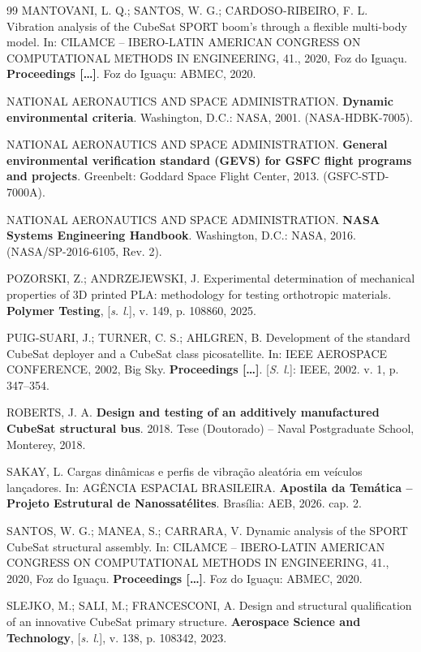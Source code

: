 \begin{thebibliography}{99}
MANTOVANI, L. Q.; SANTOS, W. G.; CARDOSO-RIBEIRO, F. L. Vibration analysis of the CubeSat SPORT boom's through a flexible multi-body model. In: CILAMCE -- IBERO-LATIN AMERICAN CONGRESS ON COMPUTATIONAL METHODS IN ENGINEERING, 41., 2020, Foz do Iguaçu. \textbf{Proceedings [\ldots]}. Foz do Iguaçu: ABMEC, 2020.

NATIONAL AERONAUTICS AND SPACE ADMINISTRATION. \textbf{Dynamic environmental criteria}. Washington, D.C.: NASA, 2001. (NASA-HDBK-7005).

NATIONAL AERONAUTICS AND SPACE ADMINISTRATION. \textbf{General environmental verification standard (GEVS) for GSFC flight programs and projects}. Greenbelt: Goddard Space Flight Center, 2013. (GSFC-STD-7000A).

NATIONAL AERONAUTICS AND SPACE ADMINISTRATION. \textbf{NASA Systems Engineering Handbook}. Washington, D.C.: NASA, 2016. (NASA/SP-2016-6105, Rev. 2).

POZORSKI, Z.; ANDRZEJEWSKI, J. Experimental determination of mechanical properties of 3D printed PLA: methodology for testing orthotropic materials. \textbf{Polymer Testing}, [\textit{s. l.}], v. 149, p. 108860, 2025.

PUIG-SUARI, J.; TURNER, C. S.; AHLGREN, B. Development of the standard CubeSat deployer and a CubeSat class picosatellite. In: IEEE AEROSPACE CONFERENCE, 2002, Big Sky. \textbf{Proceedings [\ldots]}. [\textit{S. l.}]: IEEE, 2002. v. 1, p. 347--354.

ROBERTS, J. A. \textbf{Design and testing of an additively manufactured CubeSat structural bus}. 2018. Tese (Doutorado) -- Naval Postgraduate School, Monterey, 2018.

SAKAY, L. Cargas dinâmicas e perfis de vibração aleatória em veículos lançadores. In: AGÊNCIA ESPACIAL BRASILEIRA. \textbf{Apostila da Temática -- Projeto Estrutural de Nanossatélites}. Brasília: AEB, 2026. cap. 2.

SANTOS, W. G.; MANEA, S.; CARRARA, V. Dynamic analysis of the SPORT CubeSat structural assembly. In: CILAMCE -- IBERO-LATIN AMERICAN CONGRESS ON COMPUTATIONAL METHODS IN ENGINEERING, 41., 2020, Foz do Iguaçu. \textbf{Proceedings [\ldots]}. Foz do Iguaçu: ABMEC, 2020.

SLEJKO, M.; SALI, M.; FRANCESCONI, A. Design and structural qualification of an innovative CubeSat primary structure. \textbf{Aerospace Science and Technology}, [\textit{s. l.}], v. 138, p. 108342, 2023.


\end{thebibliography}

